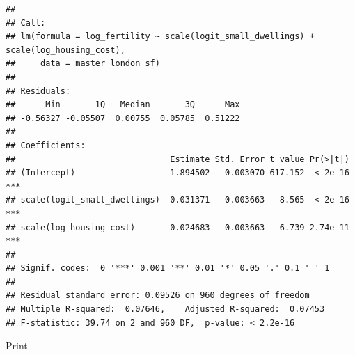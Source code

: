 \documentclass[
]{article}
\begin{document}
\begin{verbatim}
## 
## Call:
## lm(formula = log_fertility ~ scale(logit_small_dwellings) + scale(log_housing_cost), 
##     data = master_london_sf)
## 
## Residuals:
##      Min       1Q   Median       3Q      Max 
## -0.56327 -0.05507  0.00755  0.05785  0.51222 
## 
## Coefficients:
##                               Estimate Std. Error t value Pr(>|t|)    
## (Intercept)                   1.894502   0.003070 617.152  < 2e-16 ***
## scale(logit_small_dwellings) -0.031371   0.003663  -8.565  < 2e-16 ***
## scale(log_housing_cost)       0.024683   0.003663   6.739 2.74e-11 ***
## ---
## Signif. codes:  0 '***' 0.001 '**' 0.01 '*' 0.05 '.' 0.1 ' ' 1
## 
## Residual standard error: 0.09526 on 960 degrees of freedom
## Multiple R-squared:  0.07646,    Adjusted R-squared:  0.07453 
## F-statistic: 39.74 on 2 and 960 DF,  p-value: < 2.2e-16
\end{verbatim}

Print
\end{document}
